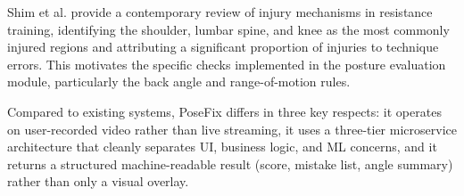 Shim et al. \cite{Shim2025} provide a contemporary review of injury mechanisms in resistance training, identifying the shoulder, lumbar spine, and knee as the most commonly injured regions and attributing a significant proportion of injuries to technique errors. This motivates the specific checks implemented in the posture evaluation module, particularly the back angle and range-of-motion rules.

Compared to existing systems, PoseFix differs in three key respects: it operates on user-recorded video rather than live streaming, it uses a three-tier microservice architecture that cleanly separates UI, business logic, and ML concerns, and it returns a structured machine-readable result (score, mistake list, angle summary) rather than only a visual overlay.
